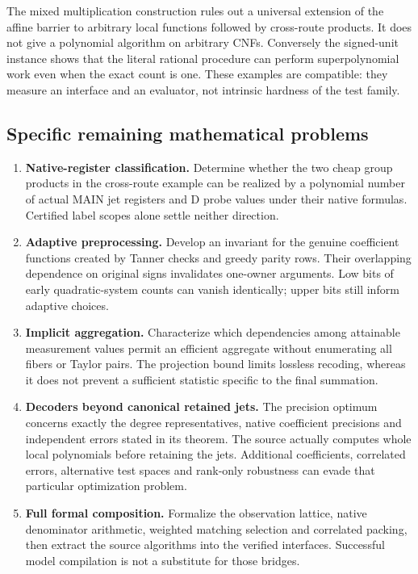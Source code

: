 \documentclass[
  11pt,
]{article}
\providecommand{\tightlist}{%
  \setlength{\itemsep}{0pt}\setlength{\parskip}{0pt}}
\begin{document}
The mixed multiplication construction rules out a universal extension of
the affine barrier to arbitrary local functions followed by cross-route
products. It does not give a polynomial algorithm on arbitrary CNFs.
Conversely the signed-unit instance shows that the literal rational
procedure can perform superpolynomial work even when the exact count is
one. These examples are compatible: they measure an interface and an
evaluator, not intrinsic hardness of the test family.

\subsection{Specific remaining mathematical
problems}\label{specific-remaining-mathematical-problems}

\begin{enumerate}
\def\labelenumi{\arabic{enumi}.}
\tightlist
\item
  \textbf{Native-register classification.} Determine whether the two
  cheap group products in the cross-route example can be realized by a
  polynomial number of actual MAIN jet registers and D probe values
  under their native formulas. Certified label scopes alone settle
  neither direction.
\item
  \textbf{Adaptive preprocessing.} Develop an invariant for the genuine
  coefficient functions created by Tanner checks and greedy parity rows.
  Their overlapping dependence on original signs invalidates one-owner
  arguments. Low bits of early quadratic-system counts can vanish
  identically; upper bits still inform adaptive choices.
\item
  \textbf{Implicit aggregation.} Characterize which dependencies among
  attainable measurement values permit an efficient aggregate without
  enumerating all fibers or Taylor pairs. The projection bound limits
  lossless recoding, whereas it does not prevent a sufficient statistic
  specific to the final summation.
\item
  \textbf{Decoders beyond canonical retained jets.} The precision
  optimum concerns exactly the degree representatives, native
  coefficient precisions and independent errors stated in its theorem.
  The source actually computes whole local polynomials before retaining
  the jets. Additional coefficients, correlated errors, alternative test
  spaces and rank-only robustness can evade that particular optimization
  problem.
\item
  \textbf{Full formal composition.} Formalize the observation lattice,
  native denominator arithmetic, weighted matching selection and
  correlated packing, then extract the source algorithms into the
  verified interfaces. Successful model compilation is not a substitute
  for those bridges.
\end{enumerate}
\end{document}
